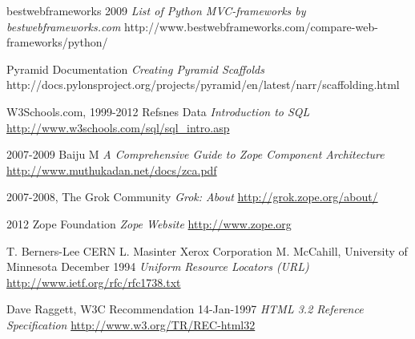 \documentclass[finnish,utf8,nonumbib,palatino,kandi]{gradu2}
\begin{document}
\begin{thebibliography}{13}
bestwebframeworks 2009
\emph{List of Python MVC-frameworks by bestwebframeworks.com}
http://www.bestwebframeworks.com/compare-web-frameworks/python/

Pyramid Documentation
\emph{Creating Pyramid Scaffolds}
http://docs.pylonsproject.org/projects/pyramid/en/latest/narr/scaffolding.html

W3Schools.com, 1999-2012 Refsnes Data
\emph{Introduction to SQL}
\url{http://www.w3schools.com/sql/sql_intro.asp}

2007-2009 Baiju M
\emph{A Comprehensive Guide to Zope Component Architecture}
\url{http://www.muthukadan.net/docs/zca.pdf}

2007-2008, The Grok Community
\emph{Grok: About}
\url{http://grok.zope.org/about/}

2012 Zope Foundation
\emph{Zope Website}
\url{http://www.zope.org}

T. Berners-Lee CERN L. Masinter Xerox Corporation M. McCahill, University of Minnesota December 1994
\emph{Uniform Resource Locators (URL)}
\url{http://www.ietf.org/rfc/rfc1738.txt}

Dave Raggett, W3C Recommendation 14-Jan-1997
\emph{HTML 3.2 Reference Specification}
\url{http://www.w3.org/TR/REC-html32}


\end{thebibliography}
\end{document}
